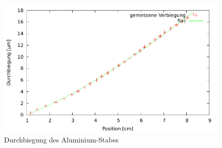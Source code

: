 \begin{figure}[ht]
 \includegraphics[width=\textwidth]{Graphen/biegung-balken3.pdf}
 \caption{Durchbiegung des Aluminium-Stabes}
\end{figure}

